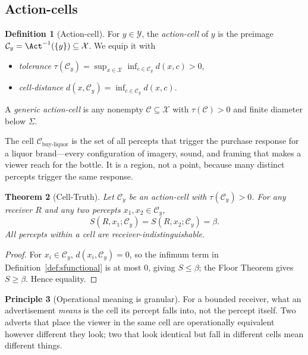 \documentclass[twocolumn,11pt,a4paper]{article}
\theoremstyle{adv}
\newtheorem{theorem}{Theorem}[section]
\theoremstyle{definition}
\newtheorem{definition}[theorem]{Definition}
\newtheorem{principle}[theorem]{Principle}
\theoremstyle{remark}
\newcommand{\Out}{\mathcal{X}}         %
\newcommand{\Acts}{\mathcal{Y}}        %
\newcommand{\Cell}{\mathcal{C}}        %
\newcommand{\Recv}{R}                  %
\newcommand{\Sval}{S}                  %
\newcommand{\floor}{\beta}            %
\newcommand{\tol}{\tau}               %
\newcommand{\dist}{d}
\newcommand{\Sig}{\Sigma}
\begin{document}
\subsection{Action-cells}

\begin{definition}[Action-cell]
\label{def:cell}
For $y\in\Acts$, the \emph{action-cell} of $y$ is the preimage
$\Cell_y=\Act^{-1}(\{y\})\subseteq\Out$. We equip it with
\begin{itemize}[leftmargin=1.4em,itemsep=1pt]
\item \emph{tolerance} $\tol(\Cell_y)=\sup_{x\in\Out}\inf_{c\in\Cell_y}\dist(x,c)>0$,
\item \emph{cell-distance} $\dist(x,\Cell_y)=\inf_{c\in\Cell_y}\dist(x,c)$.
\end{itemize}
A \emph{generic action-cell} is any nonempty $\Cell\subseteq\Out$ with
$\tol(\Cell)>0$ and finite diameter below $\Sig$.
\end{definition}

The cell $\Cell_{\text{buy-liquor}}$ is the set of all percepts that
trigger the purchase response for a liquor brand---every configuration of
imagery, sound, and framing that makes a viewer reach for the bottle. It
is a region, not a point, because many distinct percepts trigger the same
response.

\begin{theorem}[Cell-Truth]
\label{thm:celltruth}
Let $\Cell_y$ be an action-cell with $\tol(\Cell_y)>0$. For any receiver
$\Recv$ and any two percepts $x_1,x_2\in\Cell_y$,
\[
  \Sval(\Recv,x_1;\Cell_y)=\Sval(\Recv,x_2;\Cell_y)=\floor.
\]
All percepts within a cell are receiver-indistinguishable.
\end{theorem}

\begin{proof}
For $x_i\in\Cell_y$, $\dist(x_i,\Cell_y)=0$, so the infimum term in
Definition~\ref{def:sfunctional} is at most $0$, giving
$\Sval\le\floor$; the Floor Theorem gives $\Sval\ge\floor$. Hence equality.
\end{proof}

\begin{principle}[Operational meaning is granular]
\label{prin:granular}
For a bounded receiver, what an advertisement \emph{means} is the cell its
percept falls into, not the percept itself. Two adverts that place the
viewer in the same cell are operationally equivalent however different
they look; two that look identical but fall in different cells mean
different things.
\end{principle}
\end{document}
